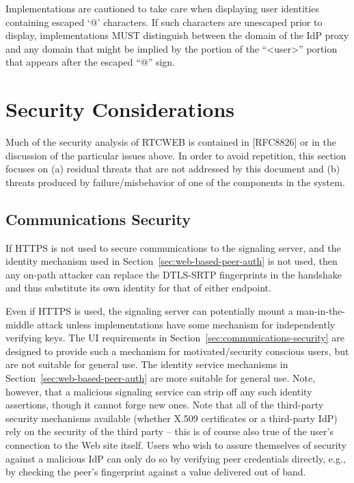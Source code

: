 \documentclass{article}
\begin{document}
Implementations are cautioned to take care when displaying user
identities containing escaped `@' characters.  If such characters are
unescaped prior to display, implementations MUST distinguish between
the domain of the IdP proxy and any domain that might be implied by
the portion of the ``\textless user\textgreater'' portion that appears after the escaped
``@'' sign.

\section{Security Considerations}

Much of the security analysis of RTCWEB is contained in [RFC8826] or
in the discussion of the particular issues above.  In order to avoid
repetition, this section focuses on (a) residual threats that are not
addressed by this document and (b) threats produced by failure/misbehavior of one of the components in the system.

\subsection{Communications Security}

If HTTPS is not used to secure communications to the signaling
server, and the identity mechanism used in Section~\ref{sec:web-based-peer-auth} is not used,
then any on-path attacker can replace the DTLS-SRTP fingerprints in
the handshake and thus substitute its own identity for that of either
endpoint.

Even if HTTPS is used, the signaling server can potentially mount a
man-in-the-middle attack unless implementations have some mechanism
for independently verifying keys.  The UI requirements in Section~\ref{sec:communications-security}
are designed to provide such a mechanism for motivated/security
conscious users, but are not suitable for general use.  The identity
service mechanisms in Section~\ref{sec:web-based-peer-auth} are more suitable for general use.
Note, however, that a malicious signaling service can strip off any
such identity assertions, though it cannot forge new ones.  Note that
all of the third-party security mechanisms available (whether X.509
certificates or a third-party IdP) rely on the security of the third
party -- this is of course also true of the user's connection to the
Web site itself.  Users who wish to assure themselves of security
against a malicious IdP can only do so by verifying peer credentials
directly, e.g., by checking the peer's fingerprint against a value
delivered out of band.
\end{document}
